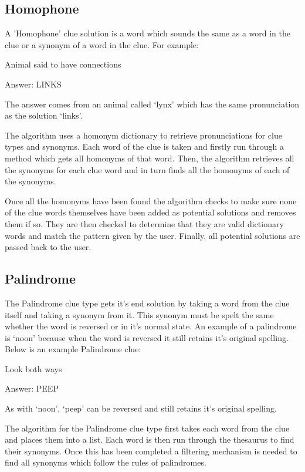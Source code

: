 \subsection{Homophone}

A 'Homophone' clue solution is a word which sounds the same as a word 
in the clue or a synonym of a word in the clue. For example:

Animal said to have connections

Answer: LINKS

The answer comes from an animal called `lynx' which has the same 
pronunciation as the solution `links'. 

The algorithm uses a homonym dictionary to retrieve pronunciations 
for clue types and synonyms. Each word of the clue is taken and 
firstly run through a method which gets all homonyms of that word. 
Then, the algorithm retrieves all the synonyms for each clue word 
and in turn finds all the homonyms of each of the synonyms. 

Once all the homonyms have been found the algorithm checks to 
make sure none of the clue words themselves have been added as 
potential solutions and removes them if so. They are then checked to 
determine that they are valid dictionary words and match the 
pattern given by the user. Finally, all potential solutions are passed 
back to the user. 

\subsection{Palindrome}

The Palindrome clue type gets it's end solution by taking a word from 
the clue itself and taking a synonym from it. This synonym must be 
spelt the same whether the word is reversed or in it's normal state. 
An example of a palindrome is `noon' because when the word is reversed 
it still retains it's original spelling. Below is an example Palindrome clue:

Look both ways

Answer: PEEP

As with `noon', `peep' can be reversed and still retains it's original spelling. 

The algorithm for the Palindrome clue type first takes each word 
from the clue and places them into a list. Each word is then run through 
the thesaurus to find their synonyms. Once this has been completed a 
filtering mechanism is needed to find all synonyms which follow the 
rules of palindromes. 

